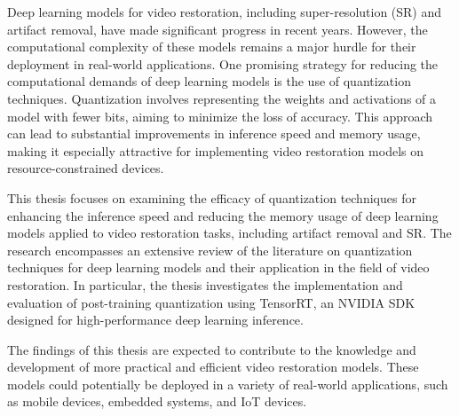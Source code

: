Deep learning models for video restoration, including super-resolution (SR) and artifact removal, have made significant progress in recent years. However, the computational complexity of these models remains a major hurdle for their deployment in real-world applications. One promising strategy for reducing the computational demands of deep learning models is the use of quantization techniques. Quantization involves representing the weights and activations of a model with fewer bits, aiming to minimize the loss of accuracy. This approach can lead to substantial improvements in inference speed and memory usage, making it especially attractive for implementing video restoration models on resource-constrained devices.

This thesis focuses on examining the efficacy of quantization techniques for enhancing the inference speed and reducing the memory usage of deep learning models applied to video restoration tasks, including artifact removal and SR. The research encompasses an extensive review of the literature on quantization techniques for deep learning models and their application in the field of video restoration. In particular, the thesis investigates the implementation and evaluation of post-training quantization using TensorRT, an NVIDIA SDK designed for high-performance deep learning inference.

The findings of this thesis are expected to contribute to the knowledge and development of more practical and efficient video restoration models. These models could potentially be deployed in a variety of real-world applications, such as mobile devices, embedded systems, and IoT devices.

